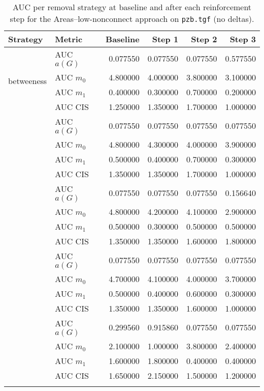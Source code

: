 
\begin{table}[htbp]
  \centering
  \caption{AUC per removal strategy at baseline and after each reinforcement step for the Areas–low-nonconnect approach on \texttt{pzb.tgf} (no deltas).}
  \label{tab:pzb-areas_low_nonconnect-auc}
  \begin{tabular}{llrrrr}
    \toprule
    \textbf{Strategy} & \textbf{Metric} & \textbf{Baseline} & \textbf{Step 1} & \textbf{Step 2} & \textbf{Step 3} \\
    \midrule
    \multirow{4}{*}{betweeness} & AUC $a(G)$ & 0.077550 & 0.077550 & 0.077550 & 0.577550 \\
    & AUC $m_0$ & 4.800000 & 4.000000 & 3.800000 & 3.100000 \\
    & AUC $m_1$ & 0.400000 & 0.300000 & 0.700000 & 0.200000 \\
    & AUC CIS & 1.250000 & 1.350000 & 1.700000 & 1.000000 \\
    \addlinespace
    \multirow{4}{*}{closeness} & AUC $a(G)$ & 0.077550 & 0.077550 & 0.077550 & 0.077550 \\
    & AUC $m_0$ & 4.800000 & 4.300000 & 4.000000 & 3.900000 \\
    & AUC $m_1$ & 0.500000 & 0.400000 & 0.700000 & 0.300000 \\
    & AUC CIS & 1.350000 & 1.350000 & 1.700000 & 1.000000 \\
    \addlinespace
    \multirow{4}{*}{core influence} & AUC $a(G)$ & 0.077550 & 0.077550 & 0.077550 & 0.156640 \\
    & AUC $m_0$ & 4.800000 & 4.200000 & 4.100000 & 2.900000 \\
    & AUC $m_1$ & 0.500000 & 0.300000 & 0.500000 & 0.500000 \\
    & AUC CIS & 1.350000 & 1.350000 & 1.600000 & 1.800000 \\
    \addlinespace
    \multirow{4}{*}{degree} & AUC $a(G)$ & 0.077550 & 0.077550 & 0.077550 & 0.077550 \\
    & AUC $m_0$ & 4.700000 & 4.100000 & 4.000000 & 3.700000 \\
    & AUC $m_1$ & 0.500000 & 0.400000 & 0.600000 & 0.300000 \\
    & AUC CIS & 1.350000 & 1.350000 & 1.600000 & 1.000000 \\
    \addlinespace
    \multirow{4}{*}{random} & AUC $a(G)$ & 0.299560 & 0.915860 & 0.077550 & 0.077550 \\
    & AUC $m_0$ & 2.100000 & 1.000000 & 3.800000 & 2.400000 \\
    & AUC $m_1$ & 1.600000 & 1.800000 & 0.400000 & 0.400000 \\
    & AUC CIS & 1.650000 & 2.150000 & 1.500000 & 1.200000 \\
    \addlinespace
    \bottomrule
  \end{tabular}
\end{table}

